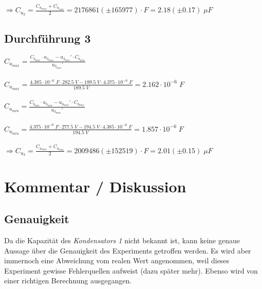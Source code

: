 \documentclass[a4paper,12pt]{article}
\begin{document}
$\Rightarrow C_{u_2}=\displaystyle{\frac{C_{u_{max}}+C_{u_{min}}}{2}} = 2176861 (\pm 165977)\cdot F = 2.18 (\pm 0.17)\; \mu F$

\newpage
\subsection{Durchführung 3}

$C_{u_{max}} = \displaystyle{\frac{C_{b_{max}}\cdot u_{3_{max}}-u_{3_{min}}'\cdot C_{b_{min}}}{u_{3_{min}}'}}$\\\\

$C_{u_{max}} = \displaystyle{\frac{4.385\cdot 10^{-6}\;F\cdot 282.5\;V-189.5\;V\cdot 4.375\cdot 10^{-6}\;F}{189.5\;V}} = 2.162\cdot 10^{-6}\; F$\\\\

$C_{u_{min}} = \displaystyle{\frac{C_{b_{min}}\cdot u_{3_{min}}-u_{3_{max}}'\cdot C_{b_{max}}}{u_{3_{max}}'}}$\\\\

$C_{u_{min}} = \displaystyle{\frac{4.375\cdot 10^{-6}\;F\cdot 277.5\;V-194.5\;V\cdot 4.385\cdot 10^{-6}\;F}{194.5\;V}} = 1.857\cdot 10^{-6}\; F$\\\\

$\Rightarrow C_{u_3}=\displaystyle{\frac{C_{u_{max}}+C_{u_{min}}}{2}} = 2009486 (\pm 152519)\cdot F = 2.01 (\pm 0.15)\;\mu F$

\section{Kommentar / Diskussion}

\subsection{Genauigkeit}

Da die Kapazität des \textit{Kondensators 1} nicht bekannt ist, kann keine genaue Aussage über die Genauigkeit des Experiments getroffen werden. Es wird aber immernoch eine Abweichung vom realen Wert angenommen, weil dieses Experiment gewisse Fehlerquellen aufweist (dazu später mehr). Ebenso wird von einer richtigen Berechnung ausgegangen.\\



\end{document}
